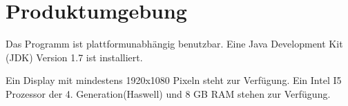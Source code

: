 
\section{Produktumgebung}

Das Programm ist plattformunabhängig benutzbar.
Eine Java Development Kit (JDK) Version 1.7 ist installiert.

Ein Display mit mindestens 1920x1080 Pixeln steht zur Verfügung.
Ein Intel I5 Prozessor der 4. Generation(Haswell) und 8 GB RAM stehen zur Verfügung.